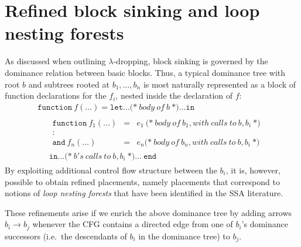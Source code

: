 \section{Refined block sinking and loop nesting forests}
\label{sec:part1:semantics:LNF}
As discussed when outlining $\lambda$-dropping, block sinking is
governed by the dominance relation between basic blocks. Thus, a
typical dominance tree with root $b$ and subtrees rooted at
$b_1,\ldots,b_n$ is most naturally represented as a block of function
declarations for the $f_i$, nested inside the declaration of $f$:
\begin{equation}
\label{sec:SSA:functiondeclarationblock}
\begin{array}{l}
  \mathtt{function}\ f (\ldots)= 
  \mathtt{let} \ldots (*\ \mathit{body\ of}\ b\ \mathit{*)}\ldots \mathtt{in}\\
  \quad \begin{array}{l}
          \begin{array}{rcl}
            \mathtt{function}\ f_1(\ldots) & = & e_1\
                  (*\ \mathit{body\ of}\ b_1, \mathit{with\ calls\ to}\ 
                      b, b_i\ \mathit{*)}\\
             : \\
            \mathtt{and}\ f_n(\ldots) & = & e_n
                  (*\ \mathit{body\ of}\ b_n, \mathit{with\ calls\ to}\ 
                      b, b_i\ \mathit{*)}
          \end{array}\\
          \mathtt{in} \ldots (*\ b\mathit{'s\ calls\ to}\ b, b_i\ \mathit{*)} 
            \ldots\ \mathtt{end}
        \end{array}
  \end{array}
\end{equation}
By exploiting additional control flow structure between the $b_i$, it
is, however, possible to obtain refined placements, namely placements
that correspond to notions of \emph{loop nesting forests} that have
been identified in the SSA literature.

These refinements arise if we enrich the above dominance tree by
adding arrows $b_i \to b_j$ whenever the CFG contains a directed
edge from one of $b_i$'s dominance successors (i.e.~the descendants of
$b_i$ in the dominance tree) to $b_j$.

